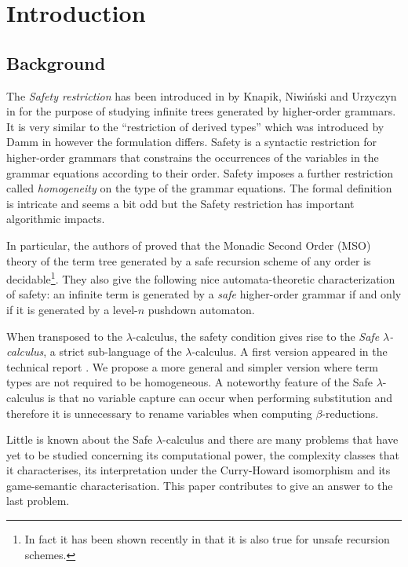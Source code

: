 \documentclass{llncs}
\begin{document}
\section{Introduction}

\subsection{Background}

The \emph{Safety restriction} has been introduced in by Knapik, Niwi{\'n}ski and Urzyczyn in \cite{KNU02}
for the purpose of studying infinite trees generated by higher-order grammars.
It is very similar to the ``restriction of derived types'' which was introduced
by Damm in \cite{Dam82} however the formulation differs.
Safety is a syntactic restriction for higher-order grammars that
constrains the occurrences of the variables in the grammar
equations according to their order. Safety imposes a further restriction called \emph{homogeneity} on the type of the grammar equations.
The formal definition is intricate and seems a bit odd but the Safety restriction has important algorithmic impacts.

In particular, the authors of \cite{KNU02} proved that the Monadic Second
Order (MSO) theory of the term tree generated by a safe recursion
scheme of any order is decidable\footnote{In fact it has been shown
recently in \cite{OngLics2006} that it is also true for unsafe
recursion schemes.}. They also give the following nice automata-theoretic characterization of safety:
an infinite term is generated by a \emph{safe} higher-order grammar if and only if
it is generated by a level-$n$ pushdown automaton.


When transposed to the $\lambda$-calculus, the safety condition
gives rise to the \emph{Safe $\lambda$-calculus}, a strict
sub-language of the $\lambda$-calculus. A first version appeared in
the technical report \cite{safety-mirlong2004}. We propose a more
general and simpler version where term types are not required to be
homogeneous. A noteworthy feature of the Safe
$\lambda$-calculus is that no variable capture can occur when
performing substitution and therefore it is unnecessary to rename
variables when computing $\beta$-reductions.

Little is known about the Safe $\lambda$-calculus and there are many
problems that have yet to be studied concerning its
computational power, the complexity classes that it characterises,
its interpretation under the Curry-Howard isomorphism and its
game-semantic characterisation. This paper contributes to give an
answer to the last problem.
\end{document}
